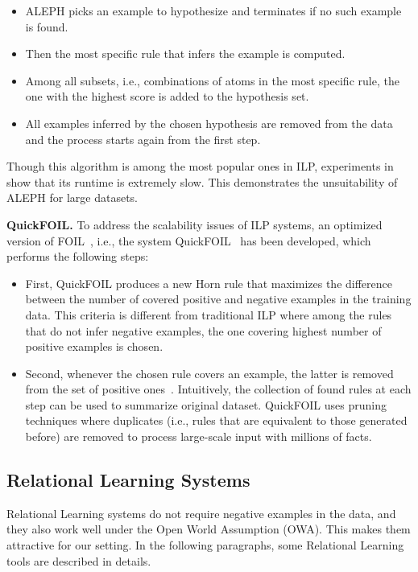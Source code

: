 \begin{itemize}
\item ALEPH picks an example to hypothesize and terminates if no such example is found.
\item Then the most specific rule that infers the example is computed.
\item Among all subsets, i.e., combinations of atoms in the most specific rule, the one with the highest score is added to the hypothesis set.
\item All examples inferred by the chosen hypothesis are removed from the data and the process starts again from the first step.
\end{itemize}

Though this algorithm is among the most popular ones in ILP, experiments in~\cite{ref10} show that its runtime is extremely slow. This demonstrates the unsuitability of ALEPH for large datasets.

\textbf{QuickFOIL.} To address the scalability issues of ILP systems, an optimized version of FOIL~\cite{ref36}, i.e., the system QuickFOIL~\cite{ref45} has been developed, which performs the following steps:

\begin{itemize}
\item First, QuickFOIL produces a new Horn rule that maximizes the difference between the number of covered positive and negative examples in the training data. This criteria is different from traditional ILP where among the rules that do not infer negative examples, the one covering highest number of positive examples is chosen.
\item Second, whenever the chosen rule covers an example, the latter is removed from the set of positive ones~\cite{ref10}. Intuitively, the collection of found rules at each step can be used to summarize original dataset. QuickFOIL uses pruning techniques where duplicates (i.e., rules that are equivalent to those generated before) are removed to process large-scale input with millions of facts.

\end{itemize}

\subsection{Relational Learning Systems}

Relational Learning systems do not require negative examples in the data, and they also work well under the Open World Assumption (OWA). This makes them attractive for our setting. In the following paragraphs, some Relational Learning tools are described in details.

